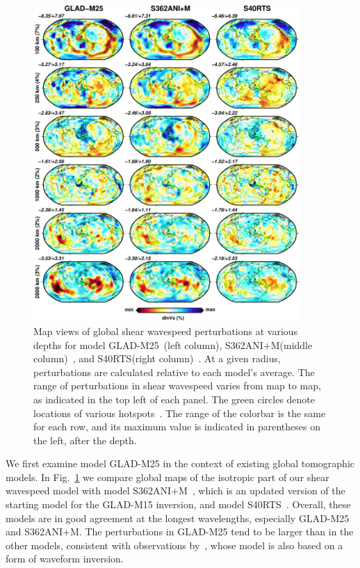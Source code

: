 \begin{figure}
  \centering
  \includegraphics[width=0.9\textwidth]{ch-GLADM25/figures/depth_slice/globe_vs.pdf}
  \caption[Map views of global shear wavespeed perturbations at various depths]
  {\small{Map views of global shear wavespeed perturbations at various depths for  model
  GLAD-M25~(left column), S362ANI$+$M(middle column)~\cite{moulik2014anisotropic},
  and S40RTS(right column)~\cite{ritsema2011s40rts}.
  At a given radius,
  perturbations are calculated relative to each model's average.
  The range of perturbations in shear wavespeed varies from map to map, as indicated in the top left of each panel.
  The green circles denote locations of various
  hotspots~\cite{montelli2006catalogue}.
  The range of the colorbar is the same for each row,
  and its maximum value is indicated in parentheses on the left, after
  the depth.}}
  \label{fig:global-vs}
\end{figure}

We first examine model GLAD-M25 in the context of existing global tomographic models.
In Fig.~\ref{fig:global-vs} we compare global maps of the isotropic part of our
shear wavespeed model with model S362ANI$+$M~\cite{moulik2014anisotropic},
which is an updated version of the starting model for the GLAD-M15 inversion,
and model S40RTS~\cite{ritsema2011s40rts}.
Overall, these models are in good agreement
at the longest wavelengths, especially GLAD-M25 and S362ANI$+$M.
The perturbations in GLAD-M25 tend to be larger than in the other models,
consistent with observations by~\cite{french2014whole},
whose model is also based on a form of waveform inversion.

